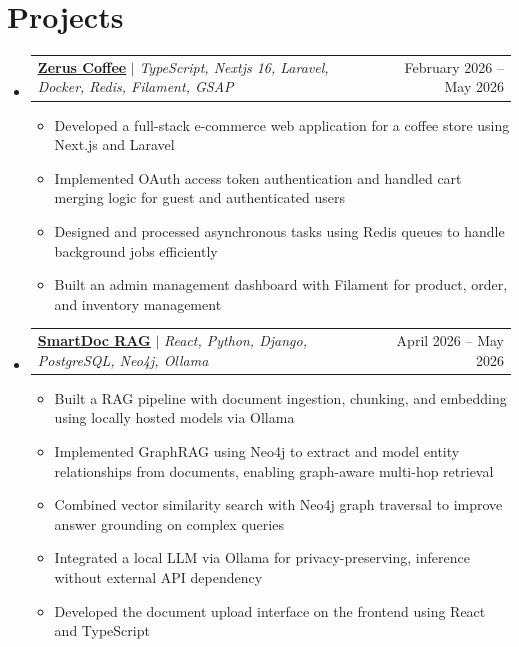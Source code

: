 \documentclass[letterpaper,11pt]{article}
\makeatletter
\newcommand{\resumeItem}[1]{
  \item\small{
    {#1 \vspace{-2pt}}
  }
}
\newcommand{\resumeProjectHeading}[2]{
    \item
    \begin{tabular*}{0.97\textwidth}{l@{\extracolsep{\fill}}r}
      \small#1 & #2 \\
    \end{tabular*}\vspace{-7pt}
}
\newcommand{\resumeSubHeadingListStart}{\begin{itemize}[leftmargin=0.15in, label={}]}
\newcommand{\resumeSubHeadingListEnd}{\end{itemize}}
\newcommand{\resumeItemListStart}{\begin{itemize}}
\newcommand{\resumeItemListEnd}{\end{itemize}\vspace{-5pt}}
\makeatother
\begin{document}
\section{Projects}
    \resumeSubHeadingListStart

        \resumeProjectHeading
        {\textbf{\href{https://github.com/ZerusCoffee}{\underline{Zerus Coffee}}} $|$ \footnotesize\emph{TypeScript, Nextjs 16, Laravel, Docker, Redis, Filament, GSAP}}{February 2026 -- May 2026}
        \resumeItemListStart
            \resumeItem{Developed a full-stack e-commerce web application for a coffee store using Next.js and Laravel}
            \resumeItem{Implemented OAuth access token authentication and handled cart merging logic for guest and authenticated users}
            \resumeItem{Designed and processed asynchronous tasks using Redis queues to handle background jobs efficiently}
            \resumeItem{Built an admin management dashboard with Filament for product, order, and inventory management}
          \resumeItemListEnd

          \resumeProjectHeading
{\textbf{\href{https://github.com/smartdoc-rag}{\underline{SmartDoc RAG}}} $|$ \footnotesize\emph{React, Python, Django, PostgreSQL, Neo4j, Ollama}}{April 2026 -- May 2026}
\resumeItemListStart
    \resumeItem{Built a RAG pipeline with document ingestion, chunking, and embedding using locally hosted models via Ollama}
    \resumeItem{Implemented GraphRAG using Neo4j to extract and model entity relationships from documents, enabling graph-aware multi-hop retrieval}
    \resumeItem{Combined vector similarity search with Neo4j graph traversal to improve answer grounding on complex queries}
    \resumeItem{Integrated a local LLM via Ollama for privacy-preserving, inference without external API dependency}
    \resumeItem{Developed the document upload interface on the frontend using React and TypeScript}
\resumeItemListEnd
          
    \resumeSubHeadingListEnd
\end{document}
